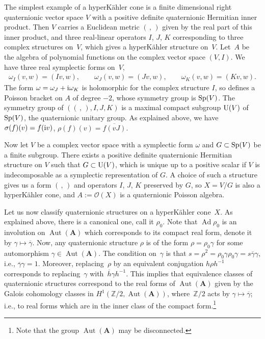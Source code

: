 \documentclass[pdftex]{sigma}
\numberwithin{equation}{section}
\begin{document}
\begin{Example} The simplest example of a hyperK\"ahler cone is a finite dimensional right quaternionic vector space $V$ with a positive definite quaternionic Hermitian inner product. Then $V$ carries a Euclidean metric $(\,,\,)$ given by the real part of this inner product, and three real-linear operators $I$, $J$, $K$ corresponding to three complex structures on~$V$, which gives a hyperK\"ahler structure on~$V$. Let~$A$ be the algebra of polynomial functions on the complex vector space $(V,I)$. We have three real symplectic forms on~$V$,
\begin{gather*}
\omega_I(v,w)=(Iv,w),\qquad \omega_J(v,w)=(Jv,w),\qquad \omega_K(v,w)=(Kv,w).
\end{gather*}
The form $\omega=\omega_J+{\rm i}\omega_K$ is holomorphic for the complex structure $I$, so defines a Poisson bracket on $A$ of degree $-2$, whose symmetry group is ${\rm Sp}(V)$. The symmetry group of $((\,,\,),I,J,K)$ is a maximal compact subgroup ${\rm U}(V)$ of ${\rm Sp}(V)$, the quaternionic unitary group. As explained above, we have $\sigma(f)(v)=f({\rm i}v)$, $\rho(f)(v)=\overline{f(vJ)}$.

Now let $V$ be a complex vector space with a symplectic form $\omega$ and $G\subset {\rm Sp}(V)$ be a finite subgroup. There exists a positive definite quaternionic Hermitian structure on $V$ such that $G\subset {\rm U}(V)$, which is unique up to a positive scalar if $V$ is indecomposable as a symplectic representation of $G$. A choice of such a structure gives us a form $(\,,\,)$ and operators $I$, $J$, $K$ preserved by $G$, so
$X=V/G$ is also a hyperK\"ahler cone, and $A:=\mathcal{O}(X)$ is a quaternionic Poisson algebra.
\end{Example}

Let us now classify quaternionic structures on a hyperK\"ahler cone~$X$. As explained above, there is a canonical one, call it $\rho_0$. Note that $\operatorname{Ad}\rho_0$ is an involution on $\operatorname{Aut}({\mathbf A})$ which corresponds to its compact real form, denote it by $\gamma\mapsto \overline{\gamma}$. Now, any quaternionic structure $\rho$ is of the form \mbox{$\rho=\rho_0\gamma$} for some automorphism $\gamma\in \operatorname{Aut}({\mathbf A})$. The condition on~$\gamma$ is that $s=\rho^2=\rho_0\gamma\rho_0\gamma=s\overline \gamma\gamma$, i.e., $\overline\gamma\gamma=1$. Moreover, replacing~$\rho$ by an equivalent conjugation $h\rho h^{-1}$ corresponds to replacing~$\gamma$ with~$\overline{h}\gamma h^{-1}$. This implies that
equivalence classes of quaternionic structures correspond to the real forms of $\operatorname{Aut}({\mathbf A})$
given by the Galois cohomology classes in $H^1({\mathbb Z}/2,\operatorname{Aut}({\mathbf A}))$, where~${\mathbb Z}/2$ acts by $\gamma\mapsto \overline{\gamma}$; i.e., to real forms which are in the inner class of the compact form.\footnote{Note that the group $\operatorname{Aut}({\mathbf A})$ may be disconnected.}
\end{document}
